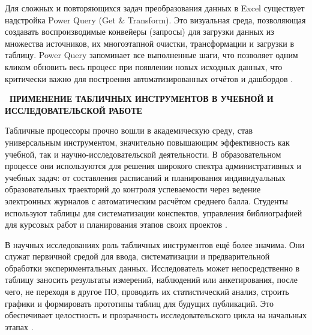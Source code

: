 \documentclass{SibFU-docs}
\begin{document}
Для сложных и повторяющихся задач преобразования данных в Excel существует надстройка Power Query (Get \& Transform). Это визуальная среда, позволяющая создавать воспроизводимые конвейеры (запросы) для загрузки данных из множества источников, их многоэтапной очистки, трансформации и загрузки в таблицу. Power Query запоминает все выполненные шаги, что позволяет одним кликом обновить весь процесс при появлении новых исходных данных, что критически важно для построения автоматизированных отчётов и дашбордов \cite{microsoft2024powerquery, dasu2003exploratory}.

\newpage
{}
\begin{center}\textbf{\thesection\ ПРИМЕНЕНИЕ ТАБЛИЧНЫХ ИНСТРУМЕНТОВ В УЧЕБНОЙ И ИССЛЕДОВАТЕЛЬСКОЙ РАБОТЕ}\end{center}
\vspace*{-1.5em}


Табличные процессоры прочно вошли в академическую среду, став универсальным инструментом, значительно повышающим эффективность как учебной, так и научно-исследовательской деятельности. В образовательном процессе они используются для решения широкого спектра административных и учебных задач: от составления расписаний и планирования индивидуальных образовательных траекторий до контроля успеваемости через ведение электронных журналов с автоматическим расчётом среднего балла. Студенты используют таблицы для систематизации конспектов, управления библиографией для курсовых работ и планирования этапов своих проектов \cite{ivanova2023research, sidorov2022education}.

В научных исследованиях роль табличных инструментов ещё более значима. Они служат первичной средой для ввода, систематизации и предварительной обработки экспериментальных данных. Исследователь может непосредственно в таблицу заносить результаты измерений, наблюдений или анкетирования, после чего, не переходя в другое ПО, проводить их статистический анализ, строить графики и формировать прототипы таблиц для будущих публикаций. Это обеспечивает целостность и прозрачность исследовательского цикла на начальных этапах \cite{stanford2024research, walkenbach2019excel}.

\end{document}
